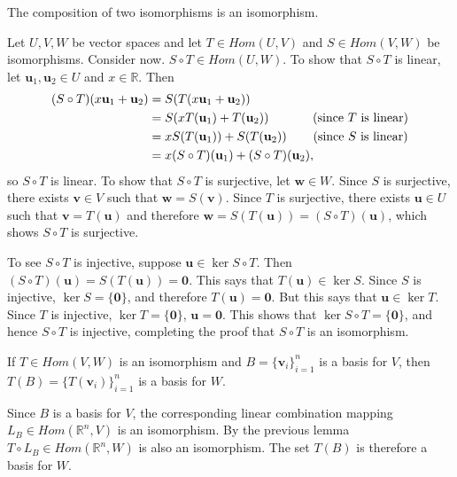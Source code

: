 \documentclass[12pt,letterpaper,reqno]{article}
\numberwithin{equation}{section}
\newcommand{\bv}{\mathbf{v}}
\newcommand{\bw}{\mathbf{w}}
\newcommand{\bu}{\mathbf{u}}
\begin{document}
\begin{lem}
	The composition of two isomorphisms is an isomorphism.
\end{lem}

\begin{pf} 
	Let $U,V,W$ be vector spaces and let $T\in Hom(U,V)$ and $S \in Hom(V,W)$ be isomorphisms. Consider now. $S \circ T \in Hom(U,W)$. To show that $S \circ T$ is linear, let $\bu_1, \bu_2 \in U$ and $x \in \mathbb{R}$. Then
	\begin{align*}
		(S \circ T)(x\bu_1+\bu_2)&=S(T(x\bu_1+\bu_2)) \\
		&=S(xT(\bu_1)+T(\bu_2)) \hspace{1.25cm} \text{(since $T$ is linear)}\\
		&=xS(T(\bu_1))+S(T(\bu_2)) \hspace{0.75cm} \text{(since $S$ is linear)} \\
		&=x(S \circ T)(\bu_1)+(S \circ T)(\bu_2),
	\end{align*}
so $S \circ T$ is linear. To show that $S \circ T$ is surjective, let $\bw \in W$. Since $S$ is surjective, there exists $\bv \in V$ such that $\bw=S(\bv)$. Since $T$ is surjective, there exists $\bu \in U$ such that $\bv=T(\bu)$ and therefore $\bw=S(T(\bu))=(S\circ T)(\bu)$, which shows $S \circ T$ is surjective. 


To see $S \circ T$ is injective, suppose $\bu \in \ker S \circ T$. Then $(S \circ T)(\bu)=S(T(\bu))=\mathbf{0}$. This says that $T(\bu)\in \ker S$. Since $S$ is injective, $\ker S=\{\mathbf{0}\}$, and therefore $T(\bu)=\mathbf{0}$. But this says that $\bu \in \ker T$. Since $T$ is injective, $\ker T=\{\mathbf{0}\}$, $\bu=\mathbf{0}$. This shows that $\ker S \circ T=\{\mathbf{0}\}$, and hence $S \circ T$ is injective, completing the proof that $S \circ T$ is an isomorphism.
\end{pf}

\begin{thm}
	If $T \in Hom(V,W)$ is an isomorphism and $B=\{\bv_i\}_{i=1}^n$ is a basis for $V$, then $T(B)=\{T(\bv_i)\}_{i=1}^n$ is a basis for $W$. 
\end{thm}

\begin{pf}
	Since $B$ is a basis for $V$, the corresponding linear combination mapping $L_B \in Hom(\mathbb{R}^n,V)$ is an isomorphism. By the previous lemma $T \circ L_B \in Hom(\mathbb{R}^n,W)$ is also an isomorphism. The set $T(B)$ is therefore a basis for $W$.
\end{pf}
\end{document}
